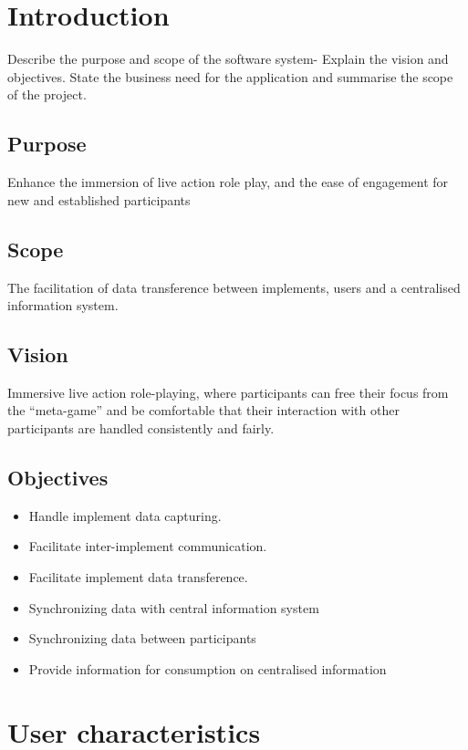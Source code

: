 \chapter{Introduction}
\label{ch:intro}
Describe the purpose and scope of the software system- Explain the vision and objectives. State the business need for the application and summarise the scope of the project.

\section{Purpose}
Enhance the immersion of live action role play, and the ease of engagement for new and established participants

\section{Scope}
The facilitation of data transference between implements, users and a centralised information system.

\section{Vision}
Immersive live action role-playing, where participants can free their focus from the “meta-game” and be comfortable that their interaction with other participants are handled consistently and fairly.

\section{Objectives}
\begin{itemize}
\item Handle implement data capturing.
\item Facilitate inter-implement communication.
\item Facilitate implement data transference.
\item Synchronizing data with central information system
\item Synchronizing data between participants
\item Provide information for consumption on centralised information
\end{itemize}


\chapter{User characteristics}
\label{User characteristics}
